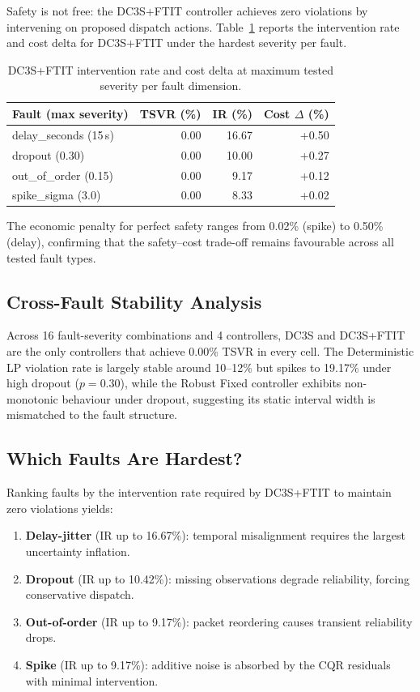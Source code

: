 Safety is not free: the DC3S+FTIT controller achieves zero violations
by intervening on proposed dispatch actions.  Table~\ref{tab:fault-ir}
reports the intervention rate and cost delta for DC3S+FTIT under the
hardest severity per fault.

\begin{table}[ht]
\centering
\caption{DC3S+FTIT intervention rate and cost delta at maximum
  tested severity per fault dimension.}
\label{tab:fault-ir}
\begin{tabular}{lrrr}
\toprule
\textbf{Fault (max severity)} & \textbf{TSVR (\%)} &
  \textbf{IR (\%)} & \textbf{Cost $\Delta$ (\%)} \\
\midrule
delay\_seconds (15\,s) & 0.00 & 16.67 & +0.50 \\
dropout (0.30)         & 0.00 & 10.00 & +0.27 \\
out\_of\_order (0.15)  & 0.00 &  9.17 & +0.12 \\
spike\_sigma (3.0)     & 0.00 &  8.33 & +0.02 \\
\bottomrule
\end{tabular}
\end{table}

The economic penalty for perfect safety ranges from 0.02\% (spike) to
0.50\% (delay), confirming that the safety--cost trade-off remains
favourable across all tested fault types.

\subsection{Cross-Fault Stability Analysis}

Across 16 fault-severity combinations and 4 controllers, DC3S and
DC3S+FTIT are the only controllers that achieve 0.00\% TSVR in every
cell.  The Deterministic LP violation rate is largely stable around
10--12\% but spikes to 19.17\% under high dropout ($p=0.30$), while
the Robust Fixed controller exhibits non-monotonic behaviour under
dropout, suggesting its static interval width is mismatched to the
fault structure.

\subsection{Which Faults Are Hardest?}

Ranking faults by the intervention rate required by DC3S+FTIT to
maintain zero violations yields:

\begin{enumerate}
  \item \textbf{Delay-jitter} (IR up to 16.67\%): temporal
    misalignment requires the largest uncertainty inflation.
  \item \textbf{Dropout} (IR up to 10.42\%): missing observations
    degrade reliability, forcing conservative dispatch.
  \item \textbf{Out-of-order} (IR up to 9.17\%): packet reordering
    causes transient reliability drops.
  \item \textbf{Spike} (IR up to 9.17\%): additive noise is absorbed
    by the CQR residuals with minimal intervention.
\end{enumerate}

